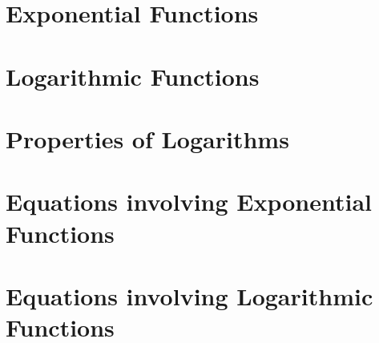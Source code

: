 \section{Exponential Functions}



\newpage

\section{Logarithmic Functions}



\newpage

\section{Properties of Logarithms}



\newpage

\section{Equations involving Exponential Functions}



\newpage

\section{Equations involving Logarithmic Functions}



\begin{comment}
\newpage

\section{Applications of Exponential and Logarithmic Functions}


\end{comment}
